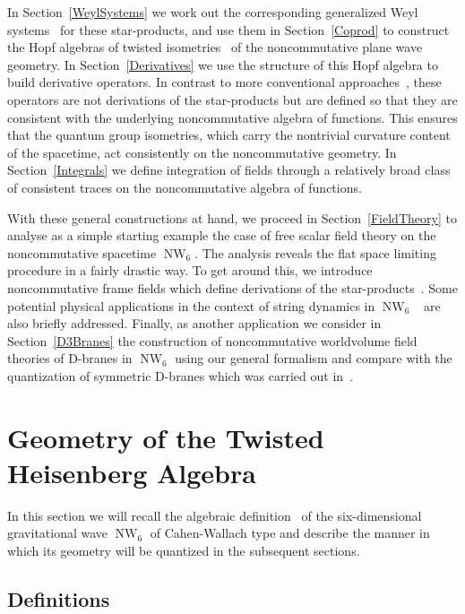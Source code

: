 \documentclass[11pt,a4paper]{article}
\DeclareMathOperator{\NW}{NW}
\newcommand{\1}{\mathbb{1}}
\newcommand{\newsection}{\setcounter{equation}{0}\section}
\begin{document}
In Section~\ref{WeylSystems} we work out the corresponding generalized
Weyl systems~\cite{ALZ1} for these star-products, and use them in
Section~\ref{Coprod} to construct the Hopf algebras of twisted
isometries~\cite{CPT1,CKNT1,Wess1} of the noncommutative plane wave
geometry. In Section~\ref{Derivatives} we use the structure of this
Hopf algebra to build derivative operators. In contrast to more
conventional approaches~\cite{ConnesBook}, these operators are not
derivations of the star-products but are defined so that they are
consistent with the underlying noncommutative algebra of
functions. This ensures that the quantum group isometries, which carry
the nontrivial curvature content of the spacetime, act consistently on
the noncommutative geometry. In Section~\ref{Integrals} we define
integration of fields through a relatively broad class of consistent
traces on the noncommutative algebra of functions.

With these general constructions at hand, we proceed in
Section~\ref{FieldTheory} to analyse as a simple starting example the
case of free scalar field theory on the noncommutative spacetime
$\NW_6$. The analysis reveals the flat space limiting procedure in a
fairly drastic way. To get around this, we introduce noncommutative
frame fields which define derivations of the
star-products~\cite{BehrSyk1,HoMiao1}. Some potential physical
applications in the context of string dynamics in
$\NW_6$~\cite{DAK1,DAK2,BDAKZ1,CFS1,PK1} are also briefly
addressed. Finally, as another application we
consider in Section~\ref{D3Branes} the construction of noncommutative
worldvolume field theories of D-branes in $\NW_6$ using our general
formalism and compare with the quantization of symmetric D-branes
which was carried out in~\cite{HSz1}.

\newsection{Geometry of the Twisted Heisenberg Algebra\label{TTHA}}

In this section we will recall the algebraic definition~\cite{SF-OF1}
of the six-dimensional gravitational wave $\NW_6$ of Cahen-Wallach
type and describe the manner in which its geometry will be quantized
in the subsequent sections.

\subsection{Definitions \label{Defs}}
\end{document}
